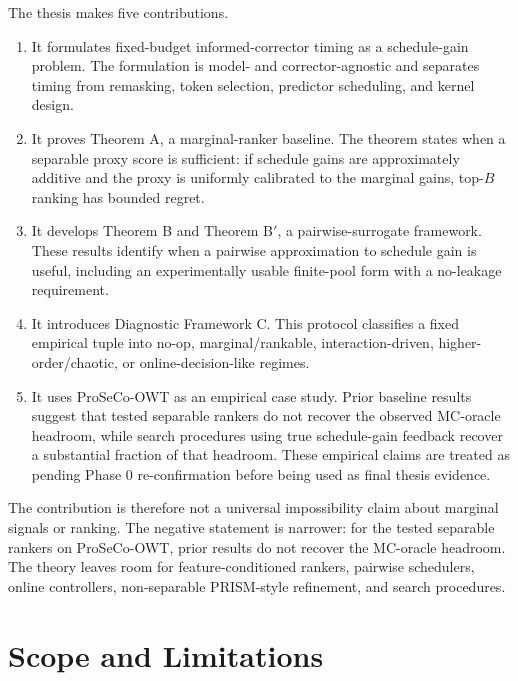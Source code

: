 The thesis makes five contributions.

\begin{enumerate}
  \item It formulates fixed-budget informed-corrector timing as a schedule-gain
  problem. The formulation is model- and corrector-agnostic and separates
  timing from remasking, token selection, predictor scheduling, and kernel
  design.

  \item It proves Theorem A, a marginal-ranker baseline. The theorem states
  when a separable proxy score is sufficient: if schedule gains are
  approximately additive and the proxy is uniformly calibrated to the marginal
  gains, top-$B$ ranking has bounded regret.

  \item It develops Theorem B and Theorem B$'$, a pairwise-surrogate
  framework. These results identify when a pairwise approximation to
  schedule gain is useful, including an experimentally usable finite-pool
  form with a no-leakage requirement.

  \item It introduces Diagnostic Framework C. This protocol classifies a fixed
  empirical tuple into no-op, marginal/rankable, interaction-driven,
  higher-order/chaotic, or online-decision-like regimes.

  \item It uses ProSeCo-OWT as an empirical case study. Prior baseline results
  suggest that tested separable rankers do not recover the observed MC-oracle
  headroom, while search procedures using true schedule-gain feedback recover
  a substantial fraction of that headroom. These empirical claims are treated
  as pending Phase 0 re-confirmation before being used as final thesis
  evidence.
\end{enumerate}

The contribution is therefore not a universal impossibility claim about
marginal signals or ranking. The negative statement is narrower: for the
tested separable rankers on ProSeCo-OWT, prior results do not recover the
MC-oracle headroom. The theory leaves room for feature-conditioned rankers,
pairwise schedulers, online controllers, non-separable PRISM-style refinement,
and search procedures.

\section{Scope and Limitations}
\label{sec:ch1-limitations}

